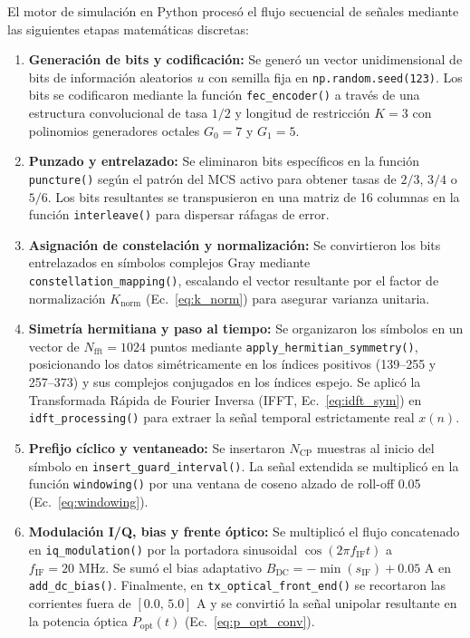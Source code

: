 El motor de simulación en Python procesó el flujo secuencial de señales mediante las siguientes etapas matemáticas discretas:
\begin{enumerate}
    \item \textbf{Generación de bits y codificación:} Se generó un vector unidimensional de bits de información aleatorios $u$ con semilla fija en \texttt{np.random.seed(123)}. Los bits se codificaron mediante la función \texttt{fec\_encoder()} a través de una estructura convolucional de tasa $1/2$ y longitud de restricción $K=3$ con polinomios generadores octales $G_0 = 7$ y $G_1 = 5$.
    \item \textbf{Punzado y entrelazado:} Se eliminaron bits específicos en la función \texttt{puncture()} según el patrón del MCS activo para obtener tasas de $2/3$, $3/4$ o $5/6$. Los bits resultantes se transpusieron en una matriz de 16 columnas en la función \texttt{interleave()} para dispersar ráfagas de error.
    \item \textbf{Asignación de constelación y normalización:} Se convirtieron los bits entrelazados en símbolos complejos Gray mediante \texttt{constellation\_mapping()}, escalando el vector resultante por el factor de normalización $K_{\text{norm}}$ (Ec.~\ref{eq:k_norm}) para asegurar varianza unitaria.
    \item \textbf{Simetría hermitiana y paso al tiempo:} Se organizaron los símbolos en un vector de $N_{\text{fft}} = 1024$ puntos mediante \texttt{apply\_hermitian\_symmetry()}, posicionando los datos simétricamente en los índices positivos (139--255 y 257--373) y sus complejos conjugados en los índices espejo. Se aplicó la Transformada Rápida de Fourier Inversa (IFFT, Ec.~\ref{eq:idft_sym}) en \texttt{idft\_processing()} para extraer la señal temporal estrictamente real $x(n)$.
    \item \textbf{Prefijo cíclico y ventaneado:} Se insertaron $N_{\text{CP}}$ muestras al inicio del símbolo en \texttt{insert\_guard\_interval()}. La señal extendida se multiplicó en la función \texttt{windowing()} por una ventana de coseno alzado de roll-off 0.05 (Ec.~\ref{eq:windowing}).
    \item \textbf{Modulación I/Q, bias y frente óptico:} Se multiplicó el flujo concatenado en \texttt{iq\_modulation()} por la portadora sinusoidal $\cos(2 \pi f_{\text{IF}} t)$ a $f_{\text{IF}} = 20\text{~MHz}$. Se sumó el bias adaptativo $B_{\text{DC}} = -\min(s_{\text{IF}}) + 0.05\text{~A}$ en \texttt{add\_dc\_bias()}. Finalmente, en \texttt{tx\_optical\_front\_end()} se recortaron las corrientes fuera de $[0.0,\, 5.0]\text{~A}$ y se convirtió la señal unipolar resultante en la potencia óptica $P_{\text{opt}}(t)$ (Ec.~\ref{eq:p_opt_conv}).

\end{enumerate}
